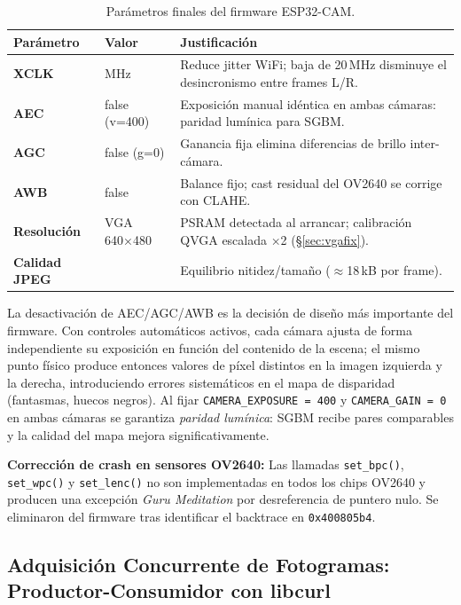 \documentclass[12pt, a4paper]{article}
\begin{document}
\begin{table}[htbp]
\centering\footnotesize
\caption{Parámetros finales del firmware ESP32-CAM.}
\label{tab:firmware}
\begin{tabular}{>{\bfseries}p{2.5cm} >{\ttfamily}p{2.2cm} p{7.5cm}}
\toprule
\normalfont\textbf{Parámetro} & \normalfont\textbf{Valor} & \textbf{Justificación} \\
\midrule
XCLK          & 6 MHz          & Reduce jitter WiFi; baja de 20\,MHz disminuye el desincronismo entre frames L/R. \\[2pt]
AEC           & false (v=400)  & Exposición manual idéntica en ambas cámaras: paridad lumínica para SGBM. \\[2pt]
AGC           & false (g=0)    & Ganancia fija elimina diferencias de brillo inter-cámara. \\[2pt]
AWB           & false          & Balance fijo; cast residual del OV2640 se corrige con CLAHE. \\[2pt]
Resolución    & VGA 640×480    & PSRAM detectada al arrancar; calibración QVGA escalada ×2 (§\ref{sec:vgafix}). \\[2pt]
Calidad JPEG  & 12             & Equilibrio nitidez/tamaño ($\approx$18\,kB por frame). \\
\bottomrule
\end{tabular}
\end{table}

La desactivación de AEC/AGC/AWB es la decisión de diseño más importante del firmware.
Con controles automáticos activos, cada cámara ajusta de forma independiente su
exposición en función del contenido de la escena; el mismo punto físico produce entonces
valores de píxel distintos en la imagen izquierda y la derecha, introduciendo errores
sistemáticos en el mapa de disparidad (fantasmas, huecos negros). Al fijar
\texttt{CAMERA\_EXPOSURE = 400} y \texttt{CAMERA\_GAIN = 0} en ambas cámaras se
garantiza \emph{paridad lumínica}: SGBM recibe pares comparables y la calidad del mapa
mejora significativamente.

\textbf{Corrección de crash en sensores OV2640:} Las llamadas
\texttt{set\_bpc()}, \texttt{set\_wpc()} y \texttt{set\_lenc()} no son implementadas
en todos los chips OV2640 y producen una excepción \emph{Guru Meditation} por
desreferencia de puntero nulo. Se eliminaron del firmware tras identificar el
backtrace en \texttt{0x400805b4}.

\subsection{Adquisición Concurrente de Fotogramas: Productor-Consumidor con libcurl}
\end{document}
